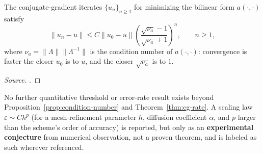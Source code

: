 \begin{theorem}
  \label{thm:cg-rate}
  The conjugate-gradient iterates $\{u_n\}_{n\ge1}$ for minimizing the
  bilinear form $a(\cdot,\cdot)$ satisfy
  \[
    \|u_n - u\| \le C\|u_0-u\|
      \left(\frac{\sqrt{\nu_a}-1}{\sqrt{\nu_a}+1}\right)^n, \qquad n\ge1,
  \]
  where $\nu_a = \|\Lambda\|\|\Lambda^{-1}\|$ is the condition number of
  $a(\cdot,\cdot)$: convergence is faster the closer $u_0$ is to $u$, and the
  closer $\sqrt{\nu_a}$ is to $1$.
\end{theorem}
\begin{proof}[Source]
  \citet{glowinski2008lectures}.
\end{proof}

\begin{remark}
  No further quantitative threshold or error-rate result exists beyond
  Proposition~\ref{prop:condition-number} and Theorem~\ref{thm:cg-rate}. A
  scaling law $\varepsilon \sim Ch^p$ (for a mesh-refinement parameter $h$,
  diffusion coefficient $\alpha$, and $p$ larger than the scheme's order of
  accuracy) is reported, but only as an \textbf{experimental conjecture} from
  numerical observation, not a proven theorem, and is labeled as such
  wherever referenced.
\end{remark}
